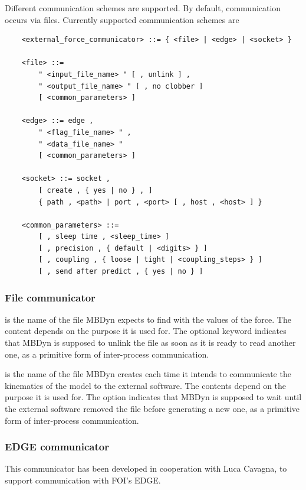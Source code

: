 Different communication schemes are supported.
By default, communication occurs via files.
Currently supported communication schemes are
\begin{verbatim}
    <external_force_communicator> ::= { <file> | <edge> | <socket> }

    <file> ::=
        " <input_file_name> " [ , unlink ] ,
        " <output_file_name> " [ , no clobber ]
        [ <common_parameters> ]

    <edge> ::= edge ,
        " <flag_file_name> " ,
        " <data_file_name> "
        [ <common_parameters> ]

    <socket> ::= socket ,
        [ create , { yes | no } , ]
        { path , <path> | port , <port> [ , host , <host> ] }

    <common_parameters> ::=
        [ , sleep time , <sleep_time> ]
        [ , precision , { default | <digits> } ]
        [ , coupling , { loose | tight | <coupling_steps> } ]
        [ , send after predict , { yes | no } ]
\end{verbatim}

\subsubsection{File communicator}
 is the name of the file MBDyn expects to find
with the values of the force.
The content depends on the purpose it is used for.
The optional keyword  indicates that MBDyn is supposed
to unlink the file as soon as it is ready to read another one,
as a primitive form of inter-process communication.

 is the name of the file MBDyn creates
each time it intends to communicate the kinematics of the model
to the external software.
The contents depend on the purpose it is used for.
The option  indicates that MBDyn is supposed to wait
until the external software removed the file before generating a new one,
as a primitive form of inter-process communication.



\subsubsection{EDGE communicator}
This communicator has been developed in cooperation with Luca Cavagna,
to support communication with FOI's EDGE.

